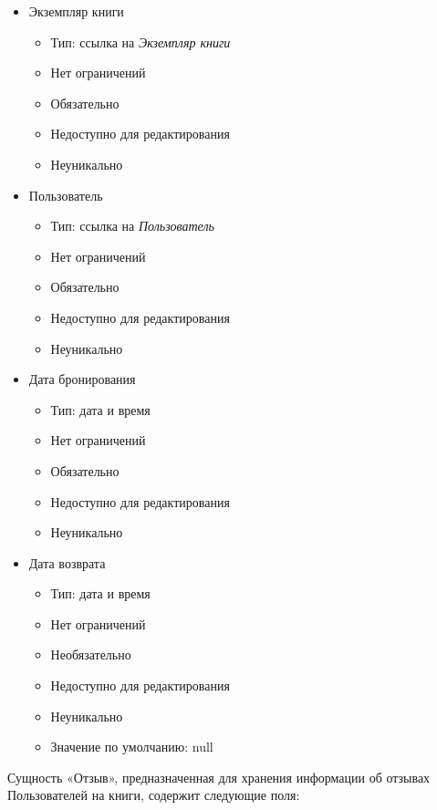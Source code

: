 \documentclass[data-specification.tex]{subfiles}
\begin{document}
\begin{itemize}
    \item Экземпляр книги
    \begin{itemize}
        \item Тип: ссылка на \textsl{Экземпляр книги}
        \item Нет ограничений
        \item Обязательно
        \item Недоступно для редактирования
        \item Неуникально
    \end{itemize}
    \item Пользователь
    \begin{itemize}
        \item Тип: ссылка на \textsl{Пользователь}
        \item Нет ограничений
        \item Обязательно
        \item Недоступно для редактирования
        \item Неуникально
    \end{itemize}
    \item Дата бронирования
    \begin{itemize}
        \item Тип: дата и время
        \item Нет ограничений
        \item Обязательно
        \item Недоступно для редактирования
        \item Неуникально
    \end{itemize}
    \item Дата возврата
    \begin{itemize}
        \item Тип: дата и время
        \item Нет ограничений
        \item Необязательно
        \item Недоступно для редактирования
        \item Неуникально
        \item Значение по умолчанию: null
    \end{itemize}
\end{itemize}
\par
Сущность «Отзыв», предназначенная для хранения информации об отзывах Пользователей на книги, содержит следующие поля:
\end{document}

